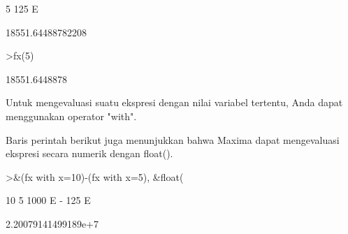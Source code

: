 \documentclass[a4paper,10pt]{article}
\begin{document}
\begin{eulernotebook}
\begin{eulercomment}
\begin{eulercomment}
\begin{euleroutput}
                                       5
                                  125 E
  
  
                            18551.64488782208
  
\end{euleroutput}
\begin{eulerprompt}
>fx(5)
\end{eulerprompt}
\begin{euleroutput}
  18551.6448878
\end{euleroutput}
\begin{eulercomment}
Untuk mengevaluasi suatu ekspresi dengan nilai variabel tertentu, Anda
dapat menggunakan operator "with".

Baris perintah berikut juga menunjukkan bahwa Maxima dapat
mengevaluasi ekspresi secara numerik dengan float().
\end{eulercomment}
\begin{eulerprompt}
>&(fx with x=10)-(fx with x=5), &float(%
\end{eulerprompt}
\begin{euleroutput}
  
                                  10        5
                            1000 E   - 125 E
  
  
                           2.20079141499189e+7
  

\end{euleroutput}
\end{eulercomment}
\end{eulercomment}
\end{eulernotebook}
\end{document}
